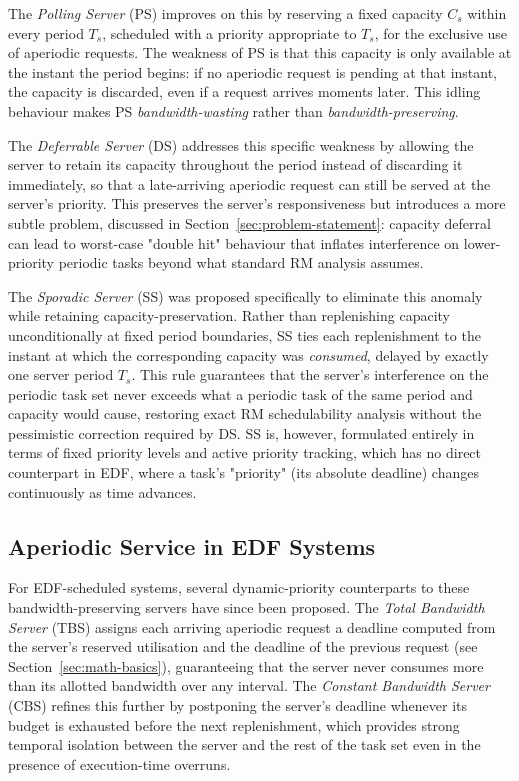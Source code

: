 \documentclass[conference]{IEEEtran}
\begin{document}
    The \emph{Polling Server} (PS) \cite{Strosnider1995} improves on this by reserving a fixed capacity $C_s$ within every period $T_s$, scheduled with a priority appropriate to $T_s$, for the exclusive use of aperiodic requests. The weakness of PS is that this capacity is only available at the instant the period begins: if no aperiodic request is pending at that instant, the capacity is discarded, even if a request arrives moments later. This idling behaviour makes PS \emph{bandwidth-wasting} rather than \emph{bandwidth-preserving}.

    The \emph{Deferrable Server} (DS) \cite{Strosnider1995} addresses this specific weakness by allowing the server to retain its capacity throughout the period instead of discarding it immediately, so that a late-arriving aperiodic request can still be served at the server's priority. This preserves the server's responsiveness but introduces a more subtle problem, discussed in Section~\ref{sec:problem-statement}: capacity deferral can lead to worst-case "double hit" behaviour that inflates interference on lower-priority periodic tasks beyond what standard RM analysis assumes.

    The \emph{Sporadic Server} (SS) \cite{Sprunt1989} was proposed specifically to eliminate this anomaly while retaining capacity-preservation. Rather than replenishing capacity unconditionally at fixed period boundaries, SS ties each replenishment to the instant at which the corresponding capacity was \emph{consumed}, delayed by exactly one server period $T_s$. This rule guarantees that the server's interference on the periodic task set never exceeds what a periodic task of the same period and capacity would cause, restoring exact RM schedulability analysis without the pessimistic correction required by DS. SS is, however, formulated entirely in terms of fixed priority levels and active priority tracking, which has no direct counterpart in EDF, where a task's "priority" (its absolute deadline) changes continuously as time advances.

    \subsection{Aperiodic Service in EDF Systems}
    For EDF-scheduled systems, several dynamic-priority counterparts to these bandwidth-preserving servers have since been proposed. The \emph{Total Bandwidth Server} (TBS) \cite{Spuri1996} assigns each arriving aperiodic request a deadline computed from the server's reserved utilisation and the deadline of the previous request (see Section~\ref{sec:math-basics}), guaranteeing that the server never consumes more than its allotted bandwidth over any interval. The \emph{Constant Bandwidth Server} (CBS) \cite{Abeni1998} refines this further by postponing the server's deadline whenever its budget is exhausted before the next replenishment, which provides strong temporal isolation between the server and the rest of the task set even in the presence of execution-time overruns.
\end{document}
